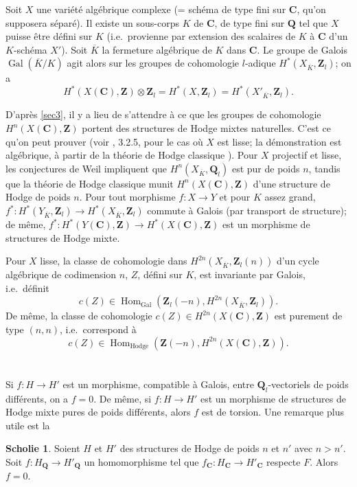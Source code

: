 \documentclass[12pt]{amsart}
\theoremstyle{definition}
\newtheorem{scholie}[principe]{Scholie}
\DeclareMathOperator{\Gal}{Gal}
\DeclareMathOperator{\Hom}{Hom}
\newcommand{\Q}{\mathbf{Q}}
\newcommand{\Z}{\mathbf{Z}}
\newcommand{\C}{\mathbf{C}}
\begin{document}
Soit $X$ une variété algébrique complexe (= schéma de type fini sur $\C$, qu'on supposera séparé). Il existe un sous-corps $K$ de $\C$, de type fini sur $\Q$ tel que $X$ puisse être défini sur $K$ (i.e.\ provienne par extension des scalaires de $K$ à $\C$ d'un $K$-schéma $X'$). Soit $\overline{K}$ la fermeture algébrique de $K$ dans $\C$. Le groupe de Galois $\Gal(\overline{K}/K)$ agit alors sur les groupes de cohomologie $l$-adique $H^{*}(X_{\overline{K}}, \Z_{l})$; on a
\[
H^{*}(X(\C), \Z) \otimes \Z_{l} = H^{*}(X, \Z_{l}) = H^{*}(X'_{\overline{K}}, \Z_{l}).
\]

D'après \ref{sec3}, il y a lieu de s'attendre à ce que les groupes de cohomologie $H^{n}(X(\C), \Z)$ portent des structures de Hodge mixtes naturelles. C'est ce qu'on peut prouver (voir \cite{Hodge2}, 3.2.5, pour le cas où $X$ est lisse; la démonstration est algébrique, à partir de la théorie de Hodge classique \cite{Weyl}). Pour $X$ projectif et lisse, les conjectures de Weil impliquent que $H^{n}(X_{\overline{K}}, \Q_{l})$ est pur de poids $n$, tandis que la théorie de Hodge classique munit $H^{n}(X(\C), \Z)$ d'une structure de Hodge de poids $n$. Pour tout morphisme $f : X \to Y$ et pour $K$ assez grand, $f^{*} : H^{*}(Y_{\overline{K}}, \Z_{l}) \to H^{*}(X_{\overline{K}}, \Z_{l})$ commute à Galois (par transport de structure); de même, $f^{*} : H^{*}(Y(\C), \Z) \to H^{*}(X(\C), \Z)$ est un morphisme de structures de Hodge mixte.

Pour $X$ lisse, la classe de cohomologie dans $H^{2n}(X_{\overline{K}}, \Z_{l}(n))$ d'un cycle algébrique de codimension $n$, $Z$, défini sur $K$, est invariante par Galois, i.e.\ définit
\[
c(Z) \in \Hom_{\Gal}(\Z_{l}(-n), H^{2n}(X_{\overline{K}}, \Z_{l})).
\]
De même, la classe de cohomologie $c(Z) \in H^{2n}(X(\C), \Z)$ est purement de type $(n,n)$, i.e.\ correspond à
\[
c(Z) \in \Hom_{\text{Hodge}}(\Z(-n), H^{2n}(X(\C), \Z)).
\]

\section{}\label{sec5}

Si $f : H \to H'$ est un morphisme, compatible à Galois, entre $\Q_{l}$-vectoriels de poids différents, on a $f = 0$. De même, si $f : H \to H'$ est un morphisme de structures de Hodge mixte pures de poids différents, alors $f$ est de torsion. Une remarque plus utile est la

\begin{scholie}\label{schol5.1}
Soient $H$ et $H'$ des structures de Hodge de poids $n$ et $n'$ avec $n > n'$. Soit $f : H_{\Q} \to H'_{\Q}$ un homomorphisme tel que $f_{\C} : H_{\C} \to H'_{\C}$ respecte $F$. Alors $f = 0$.
\end{scholie}
\end{document}
